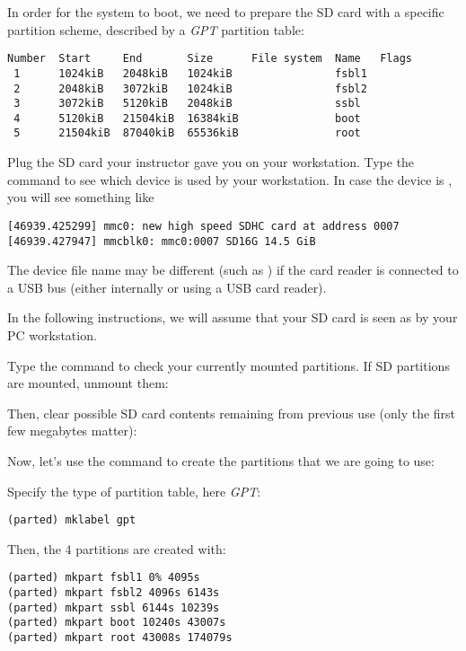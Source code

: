 In order for the system to boot, we need to prepare the SD card with a
specific partition scheme, described by a {\em GPT} partition table:

\begin{verbatim}
Number  Start     End       Size      File system  Name   Flags
 1      1024kiB   2048kiB   1024kiB                fsbl1
 2      2048kiB   3072kiB   1024kiB                fsbl2
 3      3072kiB   5120kiB   2048kiB                ssbl
 4      5120kiB   21504kiB  16384kiB               boot
 5      21504kiB  87040kiB  65536kiB               root
\end{verbatim}

Plug the SD card your instructor gave you on your workstation. Type
the  command to see which device is used by your
workstation. In case the device is , you will see
something like

\begin{verbatim}
[46939.425299] mmc0: new high speed SDHC card at address 0007
[46939.427947] mmcblk0: mmc0:0007 SD16G 14.5 GiB
\end{verbatim}

The device file name may be different (such as )
if the card reader is connected to a USB bus (either internally
or using a USB card reader).

In the following instructions, we will assume that your SD card is
seen as  by your PC workstation.

Type the  command to check your currently mounted
partitions. If SD partitions are mounted, unmount them:


Then, clear possible SD card contents remaining from previous use
(only the first few megabytes matter):


Now, let's use the  command to create the partitions that
we are going to use:


Specify the type of partition table, here {\em GPT}:

\begin{verbatim}
(parted) mklabel gpt
\end{verbatim}

Then, the 4 partitions are created with:
\begin{verbatim}
(parted) mkpart fsbl1 0% 4095s
(parted) mkpart fsbl2 4096s 6143s
(parted) mkpart ssbl 6144s 10239s
(parted) mkpart boot 10240s 43007s
(parted) mkpart root 43008s 174079s
\end{verbatim}

